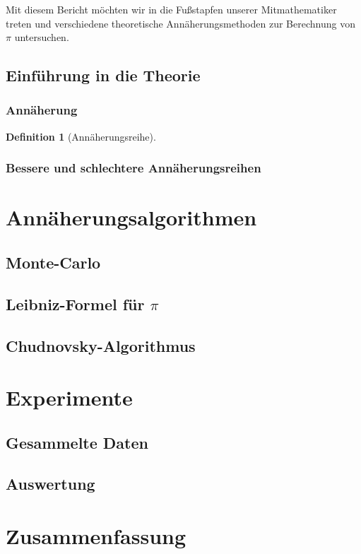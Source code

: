 \documentclass{scrartcl}
\newtheorem{definition}{Definition}
\begin{document}
Mit diesem Bericht möchten wir in die Fußstapfen unserer Mitmathematiker treten
und verschiedene theoretische Annäherungsmethoden zur Berechnung von \(\pi\)
untersuchen.

\subsection{Einführung in die Theorie}
\subsubsection{Annäherung}

\begin{definition}[Annäherungsreihe]

\end{definition}

\subsubsection{Bessere und schlechtere Annäherungsreihen}

\section{Annäherungsalgorithmen}

\subsection{Monte-Carlo}

\subsection{Leibniz-Formel für \(\pi\)}

\subsection{Chudnovsky-Algorithmus}

\section{Experimente}

\subsection{Gesammelte Daten}

\subsection{Auswertung}

\section{Zusammenfassung}

\printbibliography
\end{document}
